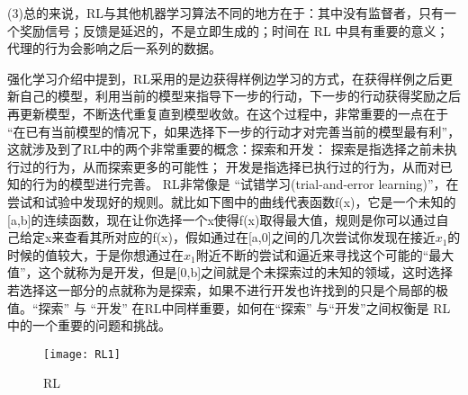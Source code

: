 \documentclass{article}
\begin{document}
(3)总的来说，RL与其他机器学习算法不同的地方在于：其中没有监督者，只有一个奖励信号；反馈是延迟的，不是立即生成的；时间在 RL 中具有重要的意义；代理的行为会影响之后一系列的数据。\par
强化学习介绍中\citep*{强化学习介绍}提到，RL采用的是边获得样例边学习的方式，在获得样例之后更新自己的模型，利用当前的模型来指导下一步的行动，下一步的行动获得奖励之后再更新模型，不断迭代重复直到模型收敛。在这个过程中，非常重要的一点在于 “在已有当前模型的情况下，如果选择下一步的行动才对完善当前的模型最有利”，这就涉及到了RL中的两个非常重要的概念：探索和开发：
探索是指选择之前未执行过的行为，从而探索更多的可能性；
开发是指选择已执行过的行为，从而对已知的行为的模型进行完善。
RL非常像是 “试错学习(trial-and-error learning)”，在尝试和试验中发现好的规则。就比如下图中的曲线代表函数f(x)，它是一个未知的[a,b]的连续函数，现在让你选择一个x使得f(x)取得最大值，规则是你可以通过自己给定x来查看其所对应的f(x)，假如通过在[a,0]之间的几次尝试你发现在接近$x_{1}$的时候的值较大，于是你想通过在$x_{1}$附近不断的尝试和逼近来寻找这个可能的“最大值”，这个就称为是开发，但是[0,b]之间就是个未探索过的未知的领域，这时选择若选择这一部分的点就称为是探索，如果不进行开发也许找到的只是个局部的极值。“探索” 与 “开发” 在RL中同样重要，如何在“探索” 与“开发”之间权衡是 RL 中的一个重要的问题和挑战。
\begin{figure}[h!]
	\centering
	\texttt{[image: RL1]}
	\caption{RL}
	\label{fig:rl1}
\end{figure}
\end{document}

